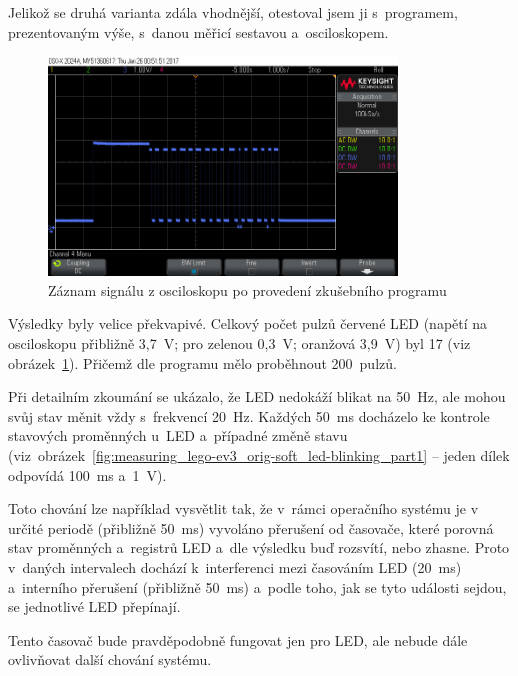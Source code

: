 Jelikož se druhá varianta zdála vhodnější, otestoval jsem ji s~programem, prezentovaným výše, s~danou měřicí sestavou a~osciloskopem. 

\begin{figure}[h]
	\centering
	\includegraphics[width=350px]{images/measuring-oscilloscope_ev3-software_led-blinking_all.png}
	\caption[Záznam signálu z osciloskopu po provedení zkušebního programu]{Záznam signálu z osciloskopu po provedení zkušebního programu}
	\label{fig:measuring_lego-ev3_orig-soft_led-blinking_all}
\end{figure}

Výsledky byly velice překvapivé. Celkový počet pulzů červené LED (napětí na osciloskopu přibližně 3,7~V; pro zelenou 0,3~V; oranžová 3,9~V) byl 17 
(viz obrázek~\ref{fig:measuring_lego-ev3_orig-soft_led-blinking_all}). Přičemž dle programu mělo proběhnout 200~pulzů.  

Při detailním zkoumání se ukázalo, že LED nedokáží blikat na 50~Hz, ale mohou svůj stav měnit vždy s~frekvencí 20~Hz. 
Každých 50~ms docházelo ke kontrole stavových proměnných u~LED a~případné změně stavu (viz~obrázek~\ref{fig:measuring_lego-ev3_orig-soft_led-blinking_part1} -- jeden dílek odpovídá 100~ms a~1~V).


Toto chování lze například vysvětlit tak, že v~rámci operačního systému  je v určité periodě (přibližně 50~ms) vyvoláno přerušení od časovače, které porovná stav proměnných a~registrů LED a~dle výsledku buď rozsvítí, nebo zhasne. 
Proto v~daných intervalech dochází k~interferenci mezi časováním LED (20~ms) a~interního přerušení (přibližně 50~ms) a~podle toho, jak se tyto události sejdou, se jednotlivé LED přepínají.

Tento časovač bude pravděpodobně fungovat jen pro LED, ale nebude dále ovlivňovat další chování systému.
 
